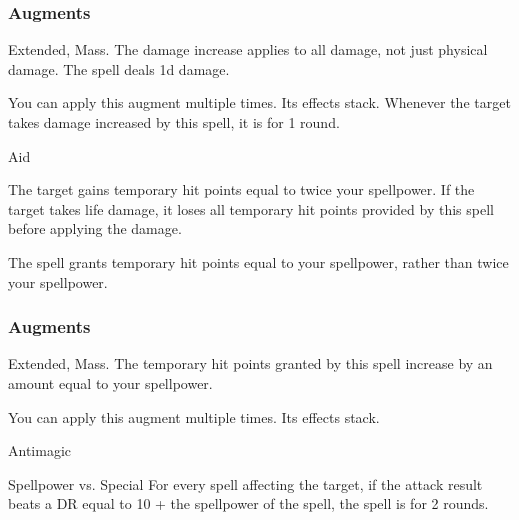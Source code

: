 \subsubsection{Augments}
 Extended, Mass.
The damage increase applies to all damage, not just physical damage.
The spell deals \plus1d damage.
\par
You can apply this augment multiple times.
Its effects stack.
Whenever the target takes damage increased by this spell, it is  for 1 round.
\begin{spellsection}{Aid}
\begin{spellcontent}
\begin{spelltargetinginfo}
\end{spelltargetinginfo}
\begin{spelleffects}
\spelleffect
The target gains temporary hit points equal to twice your spellpower.
If the target takes life damage, it loses all temporary hit points provided by this spell before applying the damage.
\spelldur \durshort
\end{spelleffects}
\end{spellcontent}
\begin{spellfooter}
\miscastexplode
\end{spellfooter}
\begin{spellcantrip}
The spell grants temporary hit points equal to your spellpower, rather than twice your spellpower.
\end{spellcantrip}
\end{spellsection}
\subsubsection{Augments}
 Extended, Mass.
The temporary hit points granted by this spell increase by an amount equal to your spellpower.
\par
You can apply this augment multiple times.
Its effects stack.
\begin{spellsection}{Antimagic}
\begin{spellcontent}
\begin{spelltargetinginfo}
\end{spelltargetinginfo}
\begin{spelleffects}
\begin{spellattack}{Spellpower vs. Special}
\spellspecial
For every spell affecting the target, if the attack result beats a DR equal to 10 + the spellpower of the spell, the spell is  for 2 rounds.
\end{spellattack}
\end{spelleffects}
\end{spellcontent}
\begin{spellfooter}
\miscastexplode
\end{spellfooter}
\end{spellsection}
